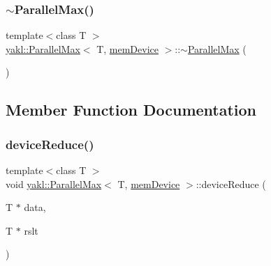 \mbox{\label{classyakl_1_1ParallelMax_3_01T_00_01memDevice_01_4_a9ffde9ce8c71aa9446324d22a9ab2520}} 
\subsubsection{\texorpdfstring{$\sim$\+Parallel\+Max()}{~ParallelMax()}}
{\footnotesize\ttfamily template$<$class T $>$ \\
\hyperlink{classyakl_1_1ParallelMax}{yakl\+::\+Parallel\+Max}$<$ T, \hyperlink{namespaceyakl_ac3c32aec58c61e7f870081477ceee883}{mem\+Device} $>$\+::$\sim$\hyperlink{classyakl_1_1ParallelMax}{Parallel\+Max} (\begin{DoxyParamCaption}{ }\end{DoxyParamCaption})\hspace{0.3cm}{\ttfamily [inline]}}



\subsection{Member Function Documentation}
\mbox{\label{classyakl_1_1ParallelMax_3_01T_00_01memDevice_01_4_ab09a0a3b10fabaf81acaeb4c7b1348b2}} 
\subsubsection{\texorpdfstring{device\+Reduce()}{deviceReduce()}}
{\footnotesize\ttfamily template$<$class T $>$ \\
void \hyperlink{classyakl_1_1ParallelMax}{yakl\+::\+Parallel\+Max}$<$ T, \hyperlink{namespaceyakl_ac3c32aec58c61e7f870081477ceee883}{mem\+Device} $>$\+::device\+Reduce (\begin{DoxyParamCaption}\item[{T $\ast$}]{data,  }\item[{T $\ast$}]{rslt }\end{DoxyParamCaption})\hspace{0.3cm}{\ttfamily [inline]}}

